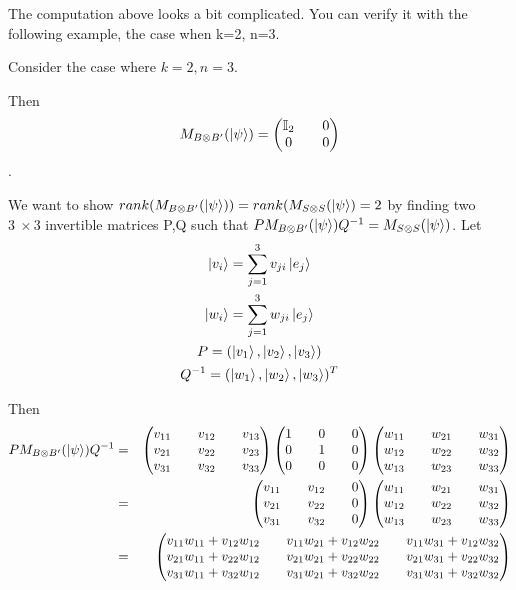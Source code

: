 The computation above looks a bit complicated. You can verify it with the following example, the case when k=2, n=3.
\begin{example}
Consider the case where $k=2, n=3$.

Then 
$$M_{B \otimes B'}(\ket{\psi})=\begin{pmatrix}
\mathbb{I}_2 && 0 \\
0 && 0
\end{pmatrix}$$.

We want to show $rank(M_{B \otimes B'}(\ket{\psi}))=rank(M_{S \otimes S}(\ket{\psi})=2$ by finding two $3\  \times 3$ invertible matrices P,Q such that $PM_{B \otimes B'}(\ket{\psi})Q^{-1}=M_{S \otimes S}(\ket{\psi})$.
Let
\begin{gather*}
\ket{v_i}=\sum_{j=1}^3 v_{ji}\ket{e_j}\\
\ket{w_i}=\sum_{j=1}^3 w_{ji}\ket{e_j}\\
P=(\ket{v_1}, \ket{v_2}, \ket{v_3})\\
Q^{-1}=(\ket{w_1}, \ket{w_2}, \ket{w_3})^T
\end{gather*}

Then
\begin{eqnarray*}
P M_{B \otimes B'}(\ket{\psi}) Q^{-1}&=&\begin{pmatrix}
v_{11} && v_{12} && v_{13}\\
v_{21} && v_{22} && v_{23}\\
v_{31} && v_{32} && v_{33}
\end{pmatrix}
\begin{pmatrix}
1 && 0 && 0\\
0 && 1 && 0\\
0 && 0 && 0\\
\end{pmatrix}
\begin{pmatrix}
w_{11} && w_{21} && w_{31}\\
w_{12} && w_{22} && w_{32}\\
w_{13} && w_{23} && w_{33}
\end{pmatrix}\\
&=&\begin{pmatrix}
v_{11} && v_{12} && 0\\
v_{21} && v_{22} && 0\\
v_{31} && v_{32} && 0
\end{pmatrix}
\begin{pmatrix}
w_{11} && w_{21} && w_{31}\\
w_{12} && w_{22} && w_{32}\\
w_{13} && w_{23} && w_{33}
\end{pmatrix}\\
&=&\begin{pmatrix}
v_{11}w_{11}+v_{12}w_{12} && v_{11}w_{21}+v_{12}w_{22} && v_{11}w_{31}+v_{12}w_{32}\\
v_{21}w_{11}+v_{22}w_{12} && v_{21}w_{21}+v_{22}w_{22} && v_{21}w_{31}+v_{22}w_{32} \\
v_{31}w_{11}+v_{32}w_{12} && v_{31}w_{21}+v_{32}w_{22} && v_{31}w_{31}+v_{32}w_{32} \\
\end{pmatrix}
\end{eqnarray*}



\end{example}
